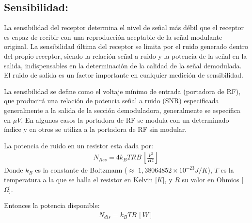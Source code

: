 \documentclass[letterpaper,10pt,spanish]{sphinxmanual}
\begin{document}
\subsection{Sensibilidad:}
\label{\detokenize{introduccion/sistemas:Sensibilidad:}}
La sensibilidad del receptor determina el nivel de señal más débil que el receptor es capaz de recibir con una reproducción aceptable de la señal modulante original. La sensibilidad última del receptor se limita por el ruido generado dentro del propio receptor, siendo la relación señal a ruido y la potencia de la señal en la salida, indispensables en la determinación de la calidad de la señal demodulada. El ruido de salida es un factor importante en cualquier medición de sensibilidad.

La sensibilidad se define como el voltaje mínimo de entrada (portadora de RF), que producirá una relación de potencia señal a ruido (SNR) especificada generalmente a la salida de la sección demoduladora, generalmente se especifica en \(\mu V\). En algunos casos la portadora de RF se modula con un determinado índice y en otros se utiliza a la portadora de RF sin modular.

La potencia de ruido en un resistor esta dada por:
\begin{equation*}
\begin{split}N_{Res} = 4 k_B T R B\,[\frac{V^2}{Hz}]\end{split}
\end{equation*}
Donde \(k_B\) es la constante de Boltzmann (\(\approx \; 1,38064852 \times 10^{-23} J/K\)), \(T\) es la temperatura a la que se halla el resistor en Kelvin {[}\(K\){]}, y \(R\) su valor en Ohmios {[}\(\Omega\){]}.

Entonces la potencia disponible:
\begin{equation*}
\begin{split}N_{dis} = k_B T B\,[W]\end{split}
\end{equation*}
\end{document}
